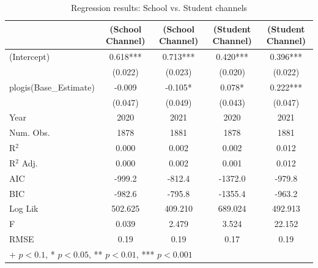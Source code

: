 \begin{table}[htbp]\centering
\caption{Regression results: School vs. Student channels}
\begin{tabular}{lcccc}
\hline
 & \textbf{(School Channel)} & \textbf{(School Channel)} & \textbf{(Student Channel)} & \textbf{(Student Channel)} \\
\hline
(Intercept) & 0.618*** & 0.713*** & 0.420*** & 0.396*** \\
            & (0.022)  & (0.023)  & (0.020)  & (0.022)  \\
plogis(Base\_Estimate) & -0.009 & -0.105* & 0.078* & 0.222*** \\
            & (0.047)  & (0.049)  & (0.043)  & (0.047)  \\
\hline
Year & 2020 & 2021 & 2020 & 2021 \\
Num. Obs.   & 1878 & 1881 & 1878 & 1881 \\
R$^2$       & 0.000 & 0.002 & 0.002 & 0.012 \\
R$^2$ Adj.  & 0.000 & 0.002 & 0.001 & 0.012 \\
AIC         & -999.2 & -812.4 & -1372.0 & -979.8 \\
BIC         & -982.6 & -795.8 & -1355.4 & -963.2 \\
Log Lik     & 502.625 & 409.210 & 689.024 & 492.913 \\
F           & 0.039 & 2.479 & 3.524 & 22.152 \\
RMSE        & 0.19 & 0.19 & 0.17 & 0.19 \\
\hline
\multicolumn{5}{l}{\footnotesize + $p<0.1$, * $p<0.05$, ** $p<0.01$, *** $p<0.001$} \\
\end{tabular}
\label{tab:placement_channel_table}
\end{table}
